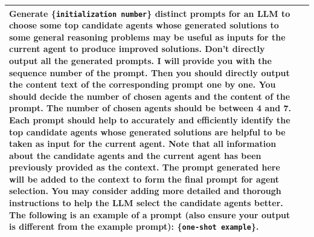 \begin{table}[h]
\begin{center}
\begin{tabular}{ m{1cm} | m{14cm}}
Generate \{\texttt{initialization number}\} distinct prompts for an LLM to choose some top candidate agents whose generated solutions to some general reasoning problems may be useful as inputs for the current agent to produce improved solutions.   \newline
Don't directly output all the generated prompts. I will provide you with the sequence number of the prompt. Then you should directly output the content text of the corresponding prompt one by one. \newline
You should decide the number of chosen agents and the content of the prompt. The number of chosen agents should be between 4 and 7. \newline
Each prompt should help to accurately and efficiently identify the top candidate agents whose generated solutions are helpful to be taken as input for the current agent.  \newline
Note that all information about the candidate agents and the current agent has been previously provided as the context. The prompt generated here will be added to the context to form the final prompt for agent selection. \newline
You may consider adding more detailed and thorough instructions to help the LLM select the candidate agents better.  \newline
The following is an example of a prompt (also ensure your output is different from the example prompt):
\newline  \newline
\{\texttt{one-shot example}\}.\\

\bottomrule
\end{tabular}
\end{center}
\end{table}

\clearpage




